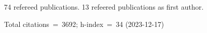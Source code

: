 74 refereed publications. 13 refeered publications as first author.

Total citations~=~3692; h-index~=~34 (2023-12-17)